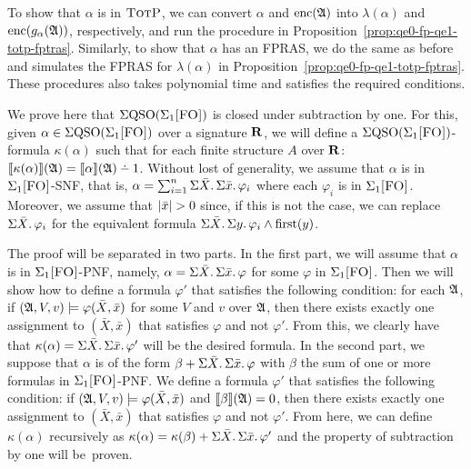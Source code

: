 To show that $\alpha$ is in $\text{\sc TotP}$, we can convert $\alpha$ and ${\rm enc}(\mathfrak{A})$ into $\lambda(\alpha)$ and ${\rm enc}(g_{\alpha}(\mathfrak{A}))$, respectively, and run the procedure in Proposition~\ref{prop:qe0-fp-qe1-totp-fptras}. Similarly, to show that $\alpha$ has an FPRAS, we do the same as before and simulates the FPRAS for $\lambda(\alpha)$ in Proposition~\ref{prop:qe0-fp-qe1-totp-fptras}. These procedures also takes polynomial time and satisfies the required conditions.

\medskip


 We prove here that $\Sigma{\rm QSO}(\Sigma_{1}\textsc{[FO]})$ is closed under subtraction by one. 
For this, given $\alpha \in \Sigma{\rm QSO}(\Sigma_{1}\textsc{[FO]})$ over a signature $\mathbf{R}$, we will define a $\Sigma{\rm QSO}(\Sigma_{1}\textsc{[FO]})$-formula $\kappa(\alpha)$ such that for each finite structure $A$ over $\mathbf{R}$: $\sem{\kappa(\alpha)}(\A) = \sem{\alpha}(\A) \dotminus 1$. 
Without lost of generality, we assume that $\alpha$ is in $\Sigma_{1}\textsc{[FO]}$-SNF, that is, $\alpha = \sum_{i = 1}^{n}\Sigma{\bar{X}}.\,\Sigma{\bar{x}}.\,\varphi_i$ where each $\varphi_i$ is in $\Sigma_{1}\textsc{[FO]}$. Moreover, we assume that $\vert \bar{x} \vert > 0$  since, if this is not the case, we can replace $\Sigma{\bar{X}}.\,\varphi_i$ for the equivalent formula $\Sigma{\bar{X}}.\, \Sigma{y}.\, \varphi_i \wedge\operatorname{first}(y)$.

The proof will be separated in two parts. In the first part, we will assume that  $\alpha$ is in $\Sigma_{1}\textsc{[FO]}$-PNF, namely, $\alpha = \Sigma{\bar{X}}.\,\Sigma{\bar{x}}.\,\varphi$ for some $\varphi$ in $\Sigma_{1}\textsc{[FO]}$. Then we will show how to define a formula $\varphi'$ that satisfies the following condition: for each $\mathfrak{A}$, if $(\mathfrak{A},V,v)\models \varphi(\bar{X},\bar{x})$ for some $V$ and $v$ over $\mathfrak{A}$, then there exists exactly one assignment to $(\bar{X},\bar{x})$ that satisfies $\varphi$ and not $\varphi'$. 
From this, we clearly have that $\kappa(\alpha) = \Sigma{\bar{X}}.\,\Sigma{\bar{x}}.\,\varphi'$ will be the desired formula. In the second part, we suppose that $\alpha$ is of the form $\beta + \Sigma{\bar{X}}.\,\Sigma{\bar{x}}.\,\varphi$ with $\beta$ the sum of one or more formulas in $\Sigma_{1}\textsc{[FO]}$-PNF. 
We define a formula $\varphi'$ that satisfies the following condition: if $(\mathfrak{A},V,v)\models \varphi(\bar{X},\bar{x})$ and ${\llbracket{}{\beta}\rrbracket}(\mathfrak{A}) = 0$, then there exists exactly one assignment to $(\bar{X},\bar{x})$ that satisfies $\varphi$ and not $\varphi'$. From here, we can define $\kappa(\alpha)$ recursively as  $\kappa(\alpha) = \kappa(\beta) +  \Sigma{\bar{X}}.\,\Sigma{\bar{x}}.\,\varphi'$ and the property of subtraction by one will be~proven.

\medskip

